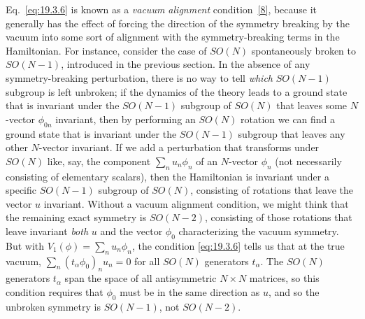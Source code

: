 Eq.~\eqref{eq:19.3.6} is known as a \emph{vacuum alignment} condition~\hyperref[ch19-ref-8]{[8]}, because it generally has the effect of forcing the direction of the symmetry breaking by the vacuum into some sort of alignment with the symmetry-breaking terms in the Hamiltonian. For instance, consider the case of $SO(N)$ spontaneously broken to $SO(N-1)$, introduced in the previous section. In the absence of any symmetry-breaking perturbation, there is no way to tell \emph{which} $SO(N-1)$ subgroup is left unbroken; if the dynamics of the theory leads to a ground state that is invariant under the $SO(N-1)$ subgroup of $SO(N)$ that leaves some $N$-vector $\phi_{0n}$ invariant, then by performing an $SO(N)$ rotation we can find a ground state that is invariant under the $SO(N-1)$ subgroup that leaves any other $N$-vector invariant. If we add a perturbation that transforms under $SO(N)$ like, say, the component $\sum_n u_n\phi_n$ of an $N$-vector $\phi_n$ (not necessarily consisting of elementary scalars), then the Hamiltonian is invariant under a specific $SO(N-1)$ subgroup of $SO(N)$, consisting of rotations that leave the vector $u$ invariant. Without a vacuum alignment condition, we might think that the remaining exact symmetry is $SO(N-2)$, consisting of those rotations that leave invariant \emph{both} $u$ and the vector $\phi_0$ characterizing the vacuum symmetry. But with $V_1(\phi)=\sum_n u_n\phi_n$, the condition \eqref{eq:19.3.6} tells us that at the true vacuum, $\sum_n(t_\alpha\phi_0)_n u_n=0$ for all $SO(N)$ generators $t_\alpha$. The $SO(N)$ generators $t_\alpha$ span the space of all antisymmetric $N\times N$ matrices, so this condition requires that $\phi_0$ must be in the same direction as $u$, and so the unbroken symmetry is $SO(N-1)$, not $SO(N-2)$.

